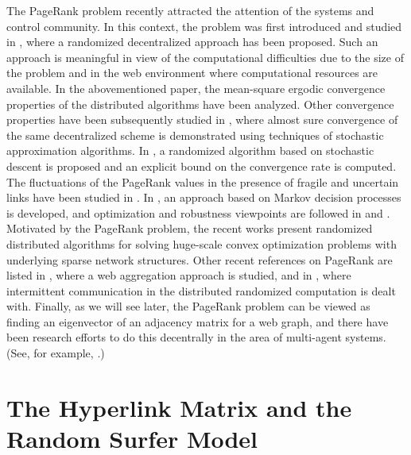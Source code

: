 \documentclass[11pt,draftcls,onecolumn]{IEEEtran}
\begin{document}
The PageRank problem recently attracted the attention of the systems and control community. 
In this context, the problem was first introduced and studied in \cite{IshTem:10}, where 
a randomized decentralized approach has been proposed. Such an approach is meaningful
in view of the computational difficulties due to the size of the problem and in the
web environment where computational resources are available. 
In the abovementioned paper, the mean-square ergodic convergence properties of 
the distributed algorithms have been analyzed. 
Other convergence properties have been 
subsequently studied in \cite{ZhaChFa:13}, where almost sure convergence of the same 
decentralized scheme is demonstrated using techniques of stochastic approximation algorithms.
In \cite{NazPol:11}, a randomized algorithm based on stochastic descent is proposed 
and an explicit bound on the convergence rate is computed. 
The fluctuations of the PageRank values in the presence of fragile and uncertain 
links have been studied in \cite{IshTem_sice:09}. 
In \cite{CsaJunBlo:09}, an approach based on 
Markov decision processes is developed, and optimization and robustness viewpoints are followed 
in \cite{FABG:13} and \cite{JudPol:12}.
Motivated by the PageRank problem, the recent works \cite{Nesterov:12,Necoara:13} present
randomized distributed algorithms for solving 
huge-scale convex optimization problems with underlying sparse network structures.
Other recent references on PageRank are listed in \cite{IshTemBai:12},
where a web aggregation approach is studied, and in \cite{IshTemBai_scl:12}, where
intermittent communication in the distributed randomized computation is dealt with.
Finally, as we will see later, the PageRank problem can be viewed as finding
an eigenvector of an adjacency matrix for a web graph, 
and there have been research efforts to do this decentrally in the 
area of multi-agent systems. (See, for example, \cite{KibCom:12}.)




\section*{The Hyperlink Matrix and the Random Surfer Model}
\end{document}
